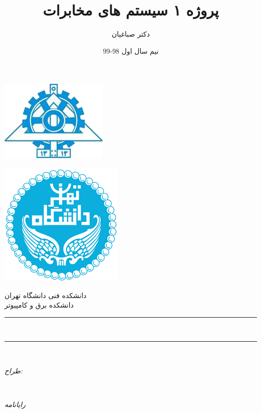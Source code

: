 \documentclass[14pt, professionalfont]{article}
\title{ پروژه ۱ سیستم های مخابرات 
	}
\author{دکتر صباغیان}
\date{نیم سال اول 98-99 }
\makeatletter
\let\thetitle\@title
\let\thedate\@date
\makeatother
\begin{document}
	
	\begin{titlepage}
		\centering
		\vspace*{2 cm}
		\begin{minipage}{\textwidth}
			\begin{minipage}{0.5\textwidth}
				\flushright
				\includegraphics[scale = 0.55]{ece.png}
				\vspace*{0.5 cm}
			\end{minipage}
			\begin{minipage}{0.5\textwidth}
				\flushleft
				\includegraphics[scale = 0.30]{ut.png}
				\vspace*{0.5 cm}
			\end{minipage}		
		\end{minipage}
	
		\textsc{\LARGE دانشکده فنی دانشگاه تهران}\\[0.5 cm]
		\textsc{\Large دانشکده برق و کامپیوتر}\\[0.5 cm]
		\rule{\linewidth}{0.2 mm}
		{ \LARGE  \bfseries \vspace{5pt} \thetitle}\\
		\vspace{5 pt}
		{\LARGE
			}
		
		\rule{\linewidth}{0.2 mm} \\[1.5 cm]
		\begin{minipage}{0.2\textwidth}
			\begin{flushright} \large
				\emph{طراح:}\\
				
			\end{flushright}
		\end{minipage}~
		\begin{minipage}{0.3\textwidth}
			\begin{flushleft} \large
				\emph{رایانامه} \\
			\end{flushleft}
		\end{minipage}\\[2 cm]
		{\large \thedate}\\[2 cm]
		\vfill
	\end{titlepage}
\end{document}
